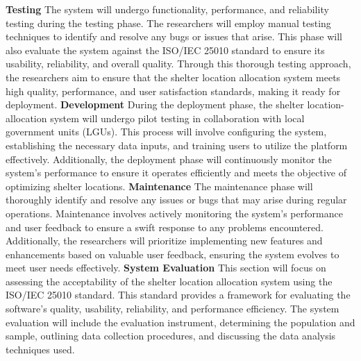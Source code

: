 \textbf{Testing}
The system will undergo functionality, performance, and reliability testing during the testing phase. The researchers will employ manual testing techniques to identify and resolve any bugs or issues that arise. This phase will also evaluate the system against the ISO/IEC 25010 standard to ensure its usability, reliability, and overall quality. Through this thorough testing approach, the researchers aim to ensure that the shelter location allocation system meets high quality, performance, and user satisfaction standards, making it ready for deployment.
\textbf{Development}
During the deployment phase, the shelter location-allocation system will undergo pilot testing in collaboration with local government units (LGUs). This process will involve configuring the system, establishing the necessary data inputs, and training users to utilize the platform effectively. Additionally, the deployment phase will continuously monitor the system's performance to ensure it operates efficiently and meets the objective of optimizing shelter locations. 
\textbf{Maintenance}
The maintenance phase will thoroughly identify and resolve any issues or bugs that may arise during regular operations. Maintenance involves actively monitoring the system's performance and user feedback to ensure a swift response to any problems encountered. Additionally, the researchers will prioritize implementing new features and enhancements based on valuable user feedback, ensuring the system evolves to meet user needs effectively.
\textbf{System Evaluation}
This section will focus on assessing the acceptability of the shelter location allocation system using the ISO/IEC 25010 standard. This standard provides a framework for evaluating the software's quality, usability, reliability, and performance efficiency. The system evaluation will include the evaluation instrument, determining the population and sample, outlining data collection procedures, and discussing the data analysis techniques used.
